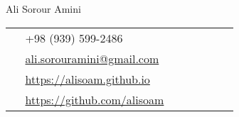 \begin{paracol}{2}
  \parbox[top][0.12\textheight][c]{\linewidth}
  {
    \vspace{-0.04\textheight}
    \centering
    {\sffamily\Huge Ali Sorour Amini}
  }
  \switchcolumn
  \parbox[top][0.12\textheight][c]{\linewidth}
  {
    \vspace{-0.04\textheight}
    \colorbox{shade}
    {
      \begin{supertabular}{p{0.05\linewidth}|p{0.775\linewidth}}
        \raisebox{-1pt}{\faPhone} & +98 (939) 599-2486 \\
        \raisebox{0pt}{\small\faEnvelope} & \href{mailto:ali.sorouramini@gmail.com}{ali.sorouramini@gmail.com} \\
        \raisebox{-1pt}{\faLink} & \href{https://alisoam.github.io}{https://alisoam.github.io} \\
        \raisebox{-1pt}{\faGithub} & \href{https://github.com/AliSoAm}{https://github.com/alisoam} \\
      \end{supertabular}
    }
  }
\end{paracol}
